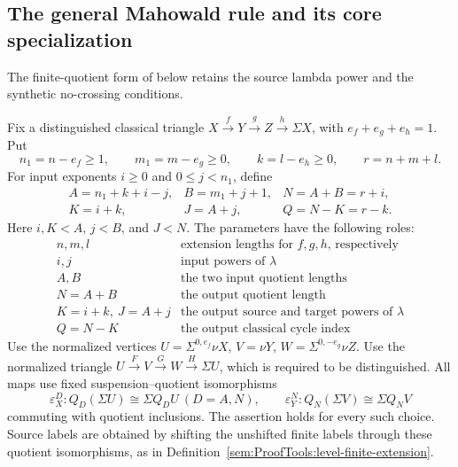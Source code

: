 \subsection{The general Mahowald rule and its core specialization}

\begin{theorem}
\label{paper:6.12}
\label{sem:ProofTools:ss-mahowald-specialization}
\sketch

The finite-quotient form of \cite[Theorem 6.12]{LWX126} below retains
the source lambda power and the synthetic no-crossing conditions.

Fix a distinguished classical triangle $X\xrightarrow fY\xrightarrow gZ\xrightarrow h\Sigma X$,
with $e_f+e_g+e_h=1$.
Put
\[
 n_1=n-e_f\ge1,\qquad m_1=m-e_g\ge0,\qquad
 k=l-e_h\ge0,\qquad r=n+m+l.
\]
For input exponents $i\ge0$ and $0\le j<n_1$, define
\[
\begin{array}{lll}
 A=n_1+k+i-j,& B=m_1+j+1,&N=A+B=r+i,\\
 K=i+k,&J=A+j,&Q=N-K=r-k.
\end{array}
\]
Here $i,K<A$, $j<B$, and $J<N$. The parameters have the following roles:
\[
\begin{array}{c|l}
 n,m,l&\text{extension lengths for }f,g,h\text{, respectively}\\
 i,j&\text{input powers of }\lambda\\
 A,B&\text{the two input quotient lengths}\\
 N=A+B&\text{the output quotient length}\\
 K=i+k,\ J=A+j&\text{the output source and target powers of }\lambda\\
 Q=N-K&\text{the output classical cycle index}
\end{array}
\]
Use the normalized vertices
$U=\Sigma^{0,e_f}\nu X$, $V=\nu Y$, $W=\Sigma^{0,-e_g}\nu Z$.
Use the normalized triangle
$U\xrightarrow{F}V\xrightarrow{G}W\xrightarrow{H}\Sigma U$,
which is required to be distinguished.
All maps use fixed suspension--quotient isomorphisms
\[
\varepsilon_X^D:Q_D(\Sigma U)\cong\Sigma Q_DU\ (D=A,N),\qquad
\varepsilon_Y^N:Q_N(\Sigma V)\cong\Sigma Q_NV
\]
commuting with quotient inclusions. The assertion holds for every such
choice. Source labels are obtained by shifting the unshifted finite
labels through these quotient isomorphisms, as in
Definition~\ref{sem:ProofTools:level-finite-extension}.


\end{theorem}
